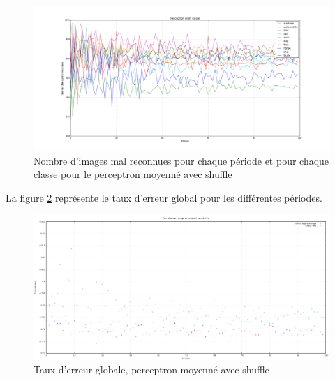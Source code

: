 \begin{figure}[H]
\begin{center}


\includegraphics[width=\textwidth]{images/Perceptron_multiclasse__moyenne_shuffle.png}
\caption{Nombre d'images mal reconnues pour chaque période et pour chaque classe pour le perceptron moyenné avec shuffle}
\label{fig:perceptron-moyenne-shuffle}
\end{center}
\end{figure}

La figure \ref{fig:erreur-perceptron-moyenne-shuffle} représente le taux d'erreur global pour les différentes périodes.

\begin{figure}[H]
\begin{center}

\includegraphics[width=\textwidth]{images/erreur_Perceptron_multiclasse_moyenne_shuffle.png}
\caption{Taux d'erreur globale, perceptron moyenné avec shuffle}
\label{fig:erreur-perceptron-moyenne-shuffle}
\end{center}
\end{figure}


